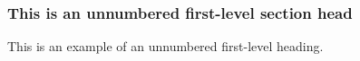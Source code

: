 \subsubsection{\label{sssec:xxx}This is an unnumbered first-level section head}
This is an example of an unnumbered first-level heading.



\endinput  %

